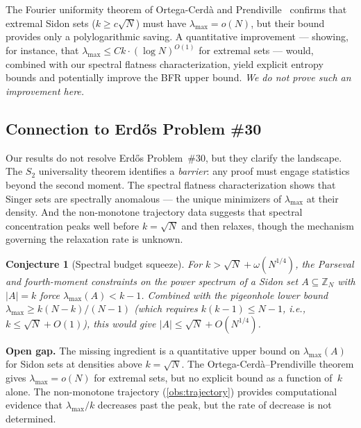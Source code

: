 \documentclass[11pt]{article}
\newtheorem{conjecture}[theorem]{Conjecture}
\theoremstyle{definition}
\theoremstyle{remark}
\newcommand{\Z}{\mathbb{Z}}
\newcommand{\lmax}{\lambda_{\max}}
\begin{document}
The Fourier uniformity theorem of Ortega-Cerd\`a and
Prendiville~\cite{OP2021} confirms that extremal Sidon sets
($k \ge c\sqrt{N}$) must have $\lmax = o(N)$, but their bound
provides only a polylogarithmic saving.  A quantitative
improvement --- showing, for instance, that
$\lmax \le C k \cdot (\log N)^{O(1)}$ for extremal sets ---
would, combined with our spectral flatness characterization,
yield explicit entropy bounds and potentially improve the
BFR upper bound.  \emph{We do not prove such an improvement here.}

\subsection{Connection to Erd\H{o}s Problem \#30}

Our results do not resolve Erd\H{o}s Problem~\#30, but they
clarify the landscape.  The $S_2$ universality theorem
identifies a \emph{barrier}: any proof must engage statistics
beyond the second moment.  The spectral flatness characterization
shows that Singer sets are spectrally anomalous --- the unique
minimizers of $\lmax$ at their density.  And the non-monotone
trajectory data suggests that spectral concentration peaks
well before $k = \sqrt{N}$ and then relaxes, though the
mechanism governing the relaxation rate is unknown.

\begin{conjecture}[Spectral budget squeeze]
\label{conj:squeeze}
For $k > \sqrt{N} + \omega(N^{1/4})$, the Parseval and
fourth-moment constraints on the power spectrum of a Sidon set
$A \subseteq \Z_N$ with $|A| = k$ force
$\lmax(A) < k - 1$.  Combined with the pigeonhole lower
bound $\lmax \ge k(N-k)/(N-1)$ (which requires
$k(k-1) \le N-1$, i.e., $k \le \sqrt{N} + O(1)$),
this would give $|A| \le \sqrt{N} + O(N^{1/4})$.
\end{conjecture}

\noindent\textbf{Open gap.} The missing ingredient is a
quantitative upper bound on $\lmax(A)$ for Sidon sets at
densities above $k = \sqrt{N}$.  The Ortega-Cerd\`a--Prendiville
theorem gives $\lmax = o(N)$ for extremal sets, but no explicit
bound as a function of~$k$ alone.  The non-monotone trajectory
(\cref{obs:trajectory}) provides computational evidence that
$\lmax/k$ decreases past the peak, but the rate of decrease is
not determined.
\end{document}
